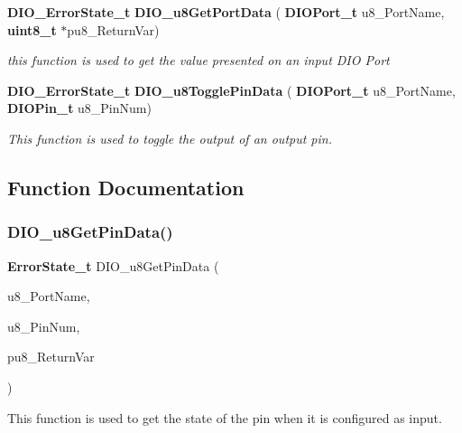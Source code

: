 \begin{DoxyCompactItemize}
\textbf{ D\+I\+O\+\_\+\+Error\+State\+\_\+t} \textbf{ D\+I\+O\+\_\+u8\+Get\+Port\+Data} (\textbf{ D\+I\+O\+Port\+\_\+t} u8\+\_\+\+Port\+Name, \textbf{ uint8\+\_\+t} $\ast$pu8\+\_\+\+Return\+Var)
\begin{DoxyCompactList}\small\item\em this function is used to get the value presented on an input D\+IO Port \end{DoxyCompactList}\item 
\textbf{ D\+I\+O\+\_\+\+Error\+State\+\_\+t} \textbf{ D\+I\+O\+\_\+u8\+Toggle\+Pin\+Data} (\textbf{ D\+I\+O\+Port\+\_\+t} u8\+\_\+\+Port\+Name, \textbf{ D\+I\+O\+Pin\+\_\+t} u8\+\_\+\+Pin\+Num)
\begin{DoxyCompactList}\small\item\em This function is used to toggle the output of an output pin. \end{DoxyCompactList}\end{DoxyCompactItemize}


\subsection{Function Documentation}
\mbox{\label{_d_i_o_8c_a413e1409f9a9885a44440376f775b818}} 
\subsubsection{D\+I\+O\+\_\+u8\+Get\+Pin\+Data()}
{\footnotesize\ttfamily \textbf{ Error\+State\+\_\+t} D\+I\+O\+\_\+u8\+Get\+Pin\+Data (\begin{DoxyParamCaption}\item[{\textbf{ D\+I\+O\+Port\+\_\+t}}]{u8\+\_\+\+Port\+Name,  }\item[{\textbf{ D\+I\+O\+Pin\+\_\+t}}]{u8\+\_\+\+Pin\+Num,  }\item[{\textbf{ uint8\+\_\+t} $\ast$}]{pu8\+\_\+\+Return\+Var }\end{DoxyParamCaption})}



This function is used to get the state of the pin when it is configured as input. 


